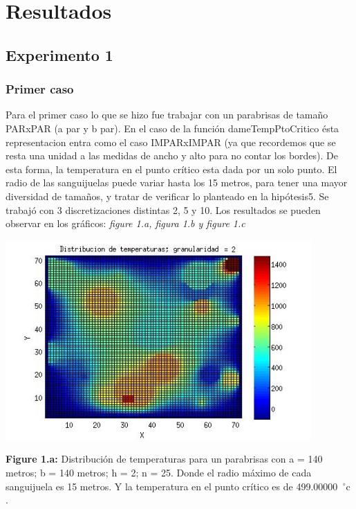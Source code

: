 \section{Resultados}

\subsection{Experimento 1}

\subsubsection{Primer caso}

Para el primer caso lo que se hizo fue trabajar con un parabrisas de tamaño PARxPAR (a par y b par). En el caso de la función dameTempPtoCritico ésta representacion entra como el caso IMPARxIMPAR (ya que recordemos que se resta una unidad a las medidas de ancho y alto para no contar los bordes). De esta forma, la temperatura en el punto crítico esta dada por un solo punto.
El radio de las sanguijuelas puede variar hasta los 15 metros, para tener una mayor diversidad de tamaños, y tratar de verificar lo planteado en la hipótesis5.\newline
Se trabajó con 3 discretizaciones distintas 2, 5 y 10. Los resultados se pueden observar en los gráficos: \textit{figure 1.a, figura 1.b y figure 1.c}

\includegraphics[width=\textwidth,height=3.0in,keepaspectratio
]{140x140h2.jpg} \newline
\begin {flushleft}
\textbf{Figure 1.a:} Distribución de temperaturas para un parabrisas con a = 140 metros; b = 140 metros; h = 2; n = 25. Donde el radio máximo de cada sanguijuela es 15 metros. Y la temperatura en el punto crítico es de 499.00000\hspace{-1.5mm}$\phantom{a}^{\circ}$c .
\end{flushleft}

